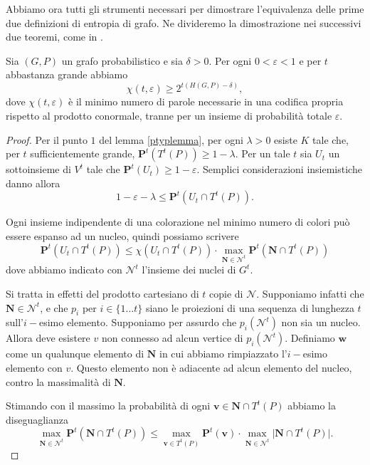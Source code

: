 Abbiamo ora tutti gli strumenti necessari per dimostrare l'equivalenza delle prime due definizioni di entropia di grafo. Ne divideremo la dimostrazione nei successivi due teoremi, come in \cite{Korner1973}.
\begin{theorem}
	[K\"orner] Sia \((G,P)\) un grafo probabilistico e sia \(\delta>0\). Per ogni \(0<\varepsilon<1\) e per \(t\) abbastanza grande abbiamo
	\[\chi(t,\varepsilon)\ge 2^{t(H(G,P)-\delta)},\]
	dove \(\chi(t, \varepsilon)\) è il minimo numero di parole necessarie in una codifica propria rispetto al prodotto conormale, tranne per un insieme di probabilità totale \(\varepsilon\). 
\end{theorem}
\begin{proof}
	Per il punto \(1\) del lemma \ref{ptyplemma}, per ogni \(\lambda>0\) esiste \(K\) tale che, per \(t\) sufficientemente grande, \(\mathbf{P}^t(T^t(P))\ge 1-\lambda\). Per un tale \(t\) sia \(U_{t}\) un sottoinsieme di \(V^t\) tale che \(\mathbf{P}^t(U_{t})\ge 1-\varepsilon\). Semplici considerazioni insiemistiche danno allora 
	\begin{equation}
		\label{eq:epsilonlambda} 1-\varepsilon-\lambda\le \mathbf{P}^t(U_{t}\cap T^t(P)). 
	\end{equation}
	
	Ogni insieme indipendente di una colorazione nel minimo numero di colori può essere espanso ad un nucleo, quindi possiamo scrivere 
	\begin{equation}
		\label{eq:expansion} \mathbf{P}^t(U_{t}\cap T^t(P))\le \chi(U_{t}\cap T^t(P))\cdot\max_{\mathbf{N}\in \mathcal{N}^t} \mathbf{P}^t(\mathbf{N}\cap T^t(P)) 
	\end{equation}
	dove abbiamo indicato con \(\mathcal{N}^t\) l'insieme dei nuclei di \(G^t\).
	
	Si tratta in effetti del prodotto cartesiano di \(t\) copie di \(\mathcal{N}\). Supponiamo infatti che \(\mathbf{N}\in \mathcal{N}^t\), e che \(p_i\) per \(i\in\{1\dots t\}\) siano le proiezioni di una sequenza di lunghezza \(t\) sull'\(i-\)esimo elemento. Supponiamo per assurdo che \(p_i(\mathcal{N}^t)\) non sia un nucleo. Allora deve esistere \(v\) non connesso ad alcun vertice di \(p_i(\mathcal{N}^t)\). Definiamo \(\mathbf{w}\) come un qualunque elemento di \(\mathbf{N}\) in cui abbiamo rimpiazzato l'\(i-\)esimo elemento con \(v\). Questo elemento non è adiacente ad alcun elemento del nucleo, contro la massimalità di \(\mathbf{N}\).
	
	Stimando con il massimo la probabilità di ogni \(\mathbf{v}\in \mathbf{N}\cap T^{t}(P)\) abbiamo la diseguaglianza 
	\begin{equation}
		\label{eq:maxmax} \max_{\mathbf{N}\in \mathcal{N}^t} \mathbf{P}^t(\mathbf{N}\cap T^t(P))\le \max_{\mathbf{v}\in T^{t}(P)} \mathbf{P}^t(\mathbf{v})\cdot \max_{\mathbf{N}\in \mathcal{N}^t} \big\vert \mathbf{N}\cap T^t(P) \big\vert. 
	\end{equation}
	

\end{proof}
